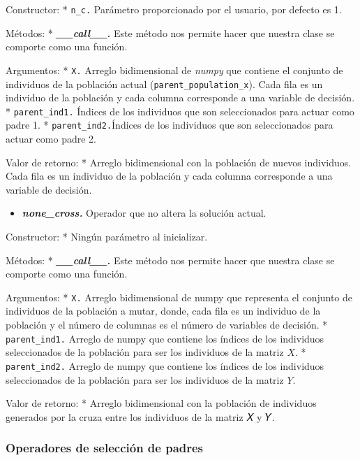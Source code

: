 \documentclass[11pt]{article}
\providecommand{\tightlist}{%
      \setlength{\itemsep}{0pt}\setlength{\parskip}{0pt}}
\begin{document}
Constructor: * \texttt{n\_c.} Parámetro proporcionado por el usuario,
por defecto es 1.

Métodos: * \emph{\textbf{\_\_call\_\_.}} Este método nos permite hacer
que nuestra clase se comporte como una función.

Argumentos: * \texttt{X.} Arreglo bidimensional de \emph{numpy} que
contiene el conjunto de individuos de la población actual
(\texttt{parent\_population\_x}). Cada fila es un individuo de la
población y cada columna corresponde a una variable de decisión. *
\texttt{parent\_ind1.} Índices de los individuos que son seleccionados
para actuar como padre 1. * \texttt{parent\_ind2.}Índices de los
individuos que son seleccionados para actuar como padre 2.

Valor de retorno: * Arreglo bidimensional con la población de nuevos
individuos. Cada fila es un individuo de la población y cada columna
corresponde a una variable de decisión.

    \begin{itemize}
\tightlist
\item
  \emph{\textbf{none\_cross.}} Operador que no altera la solución
  actual.
\end{itemize}

Constructor: * Ningún parámetro al inicializar.

Métodos: * \emph{\textbf{\_\_call\_\_.}} Este método nos permite hacer
que nuestra clase se comporte como una función.

Argumentos: * \texttt{X.} Arreglo bidimensional de numpy que representa
el conjunto de individuos de la población a mutar, donde, cada fila es
un individuo de la población y el número de columnas es el número de
variables de decisión. * \texttt{parent\_ind1.} Arreglo de numpy que
contiene los índices de los individuos seleccionados de la población
para ser los individuos de la matriz \(𝑋\). * \texttt{parent\_ind2.}
Arreglo de numpy que contiene los índices de los individuos
seleccionados de la población para ser los individuos de la matriz
\(Y\).

Valor de retorno: * Arreglo bidimensional con la población de individuos
generados por la cruza entre los individuos de la matriz 𝑋 y 𝑌.

    \subsubsection{Operadores de selección de
padres}\label{operadores-de-selecciuxf3n-de-padres}
\end{document}
